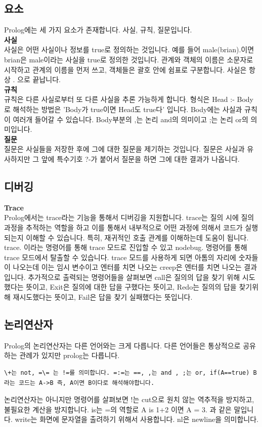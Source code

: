 \documentclass{article}
\begin{document}
\subsection{요소}
Prolog에는 세 가지 요소가 존재합니다. 사실, 규칙, 질문입니다.\\
{\bf 사실}\\
사실은 어떤 사실이나 정보를 true로 정의하는 것입니다. 예를 들어 male(brian).이면 brian은 male이라는 사실을 true로 정의한 것입니다. 관계와 객체의 이름은 소문자로 시작하고 관계의 이름을 먼저 쓰고, 객체들은 괄호 안에 쉼표로 구분합니다.
사실은 항상 . 으로 끝납니다. \\
{\bf 규칙}\\
규칙은 다른 사실로부터 또 다른 사실을 추론 가능하게 합니다. 형식은 Head :- Body로 해석하는 방법은 'Body가 true이면 Head도 true다' 입니다. Body에는 사실과 규칙이 여러개 들어갈 수 있습니다. Body부분의 ,는 논리 and의 의미이고 ;는 논리 or의 의미입니다. \\
{\bf 질문}\\
질문은 사실들을 저장한 후에 그에 대한 질문을 제기하는 것입니다. 질문은 사실과 유사하지만 그 앞에 특수기호 ?-가 붙어서 질문을 하면 그에 대한 결과가 나옵니다. \\
\subsection{디버깅}
{\bf Trace}\\
Prolog에서는 trace라는 기능을 통해서 디버깅을 지원합니다. trace는 질의 시에 질의 과정을 추적하는 역할을 하고 이를 통해서 내부적으로 어떤 과정에 의해서 코드가 실행되는지 이해할 수 있습니다. 특히, 재귀적인 호출 관계를 이해하는데 도움이 됩니다. trace. 이라는 명령어를 통해 trace 모드로 진입할 수 있고 nodebug. 명령어를 통해 trace 모드에서 탈출할 수 있습니다. trace 모드를 사용하게 되면 아톰의 자리에 숫자들이 나오는데 이는 임시 변수이고 엔터를 치면 나오는 creep은 엔터를 치면 나오는 결과입니다. 추가적으로 출력되는 명령어들을 살펴보면 call은 질의의 답을 찾기 위해 시도했다는 뜻이고, Exit은 질의에 대한 답을 구했다는 뜻이고, Redo는 질의의 답을 찾기위해 재시도했다는 뜻이고, Fail은 답을 찾기 실패했다는 뜻입니다.
\subsection{논리연산자}
Prolog의 논리연산자는 다른 언어와는 크게 다릅니다. 다른 언어들은 통상적으로 공유하는 관례가 있지만 prolog는 다릅니다. 
\begin{verbatim}
\+는 not, =\= 는 !=를 의미합니다. =:=는 ==, ,는 and , ;는 or, if(A==true) B 라는 코드는 A->B 즉, A이면 B이다로 해석해야합니다.
\end{verbatim}
논리연산자는 아니지만 명령어를 살펴보면 !는 cut으로 원치 않는 역추적을 방지하고, 불필요한 계산을 방지합니다. is는 =의 역할로 A is 1+2 이면 A = 3. 과 같은 말입니다. write는 화면에 문자열을 출려하기 위해서 사용합니다. nl은 newline을 의미합니다.
\end{document}
